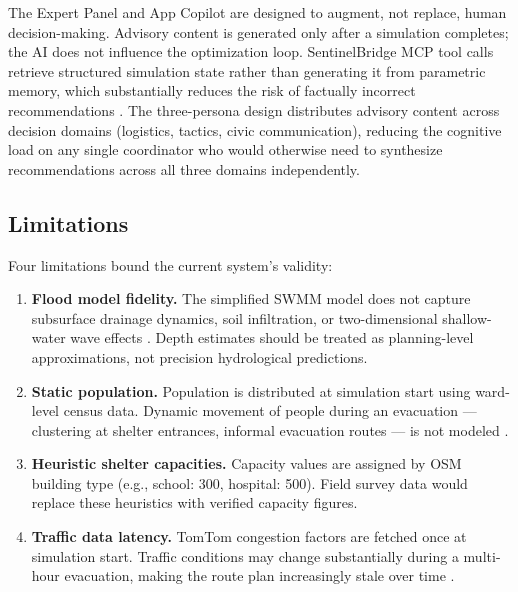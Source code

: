 \documentclass[journal]{IEEEtran}
\begin{document}
The Expert Panel and App Copilot are designed to augment, not replace, human decision-making.
Advisory content is generated only after a simulation completes; the AI does not influence
the optimization loop. SentinelBridge MCP tool calls retrieve structured simulation state
rather than generating it from parametric memory, which substantially reduces the risk of
factually incorrect recommendations \cite{alizadeh2023humancentered}. The three-persona
design distributes advisory content across decision domains (logistics, tactics, civic
communication), reducing the cognitive load on any single coordinator who would otherwise
need to synthesize recommendations across all three domains independently.

\subsection{Limitations}

Four limitations bound the current system's validity:

\begin{enumerate}
  \item \textbf{Flood model fidelity.} The simplified SWMM model does not capture
  subsurface drainage dynamics, soil infiltration, or two-dimensional shallow-water wave
  effects \cite{anik2025evolution}. Depth estimates should be treated as planning-level
  approximations, not precision hydrological predictions.

  \item \textbf{Static population.} Population is distributed at simulation start using
  ward-level census data. Dynamic movement of people during an evacuation — clustering at
  shelter entrances, informal evacuation routes — is not modeled \cite{chen2025evacuation}.

  \item \textbf{Heuristic shelter capacities.} Capacity values are assigned by OSM building
  type (e.g., school: 300, hospital: 500). Field survey data would replace these heuristics
  with verified capacity figures.

  \item \textbf{Traffic data latency.} TomTom congestion factors are fetched once at
  simulation start. Traffic conditions may change substantially during a multi-hour
  evacuation, making the route plan increasingly stale over time \cite{wang2024congestion}.
\end{enumerate}

\end{document}

